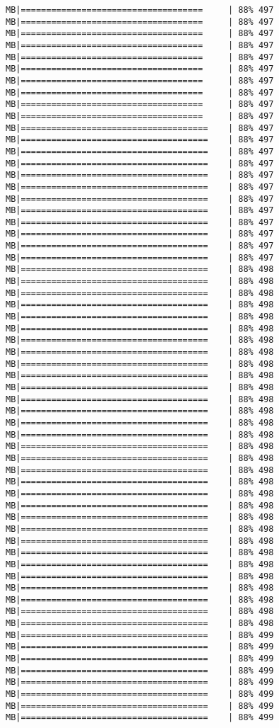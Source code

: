 \documentclass[
]{article}
\begin{document}
\begin{verbatim}
MB|====================================     | 88% 497 MB|====================================     | 88% 497 MB|====================================     | 88% 497 MB|====================================     | 88% 497 MB|====================================     | 88% 497 MB|====================================     | 88% 497 MB|====================================     | 88% 497 MB|====================================     | 88% 497 MB|====================================     | 88% 497 MB|====================================     | 88% 497 MB|=====================================    | 88% 497 MB|=====================================    | 88% 497 MB|=====================================    | 88% 497 MB|=====================================    | 88% 497 MB|=====================================    | 88% 497 MB|=====================================    | 88% 497 MB|=====================================    | 88% 497 MB|=====================================    | 88% 497 MB|=====================================    | 88% 497 MB|=====================================    | 88% 497 MB|=====================================    | 88% 497 MB|=====================================    | 88% 497 MB|=====================================    | 88% 498 MB|=====================================    | 88% 498 MB|=====================================    | 88% 498 MB|=====================================    | 88% 498 MB|=====================================    | 88% 498 MB|=====================================    | 88% 498 MB|=====================================    | 88% 498 MB|=====================================    | 88% 498 MB|=====================================    | 88% 498 MB|=====================================    | 88% 498 MB|=====================================    | 88% 498 MB|=====================================    | 88% 498 MB|=====================================    | 88% 498 MB|=====================================    | 88% 498 MB|=====================================    | 88% 498 MB|=====================================    | 88% 498 MB|=====================================    | 88% 498 MB|=====================================    | 88% 498 MB|=====================================    | 88% 498 MB|=====================================    | 88% 498 MB|=====================================    | 88% 498 MB|=====================================    | 88% 498 MB|=====================================    | 88% 498 MB|=====================================    | 88% 498 MB|=====================================    | 88% 498 MB|=====================================    | 88% 498 MB|=====================================    | 88% 498 MB|=====================================    | 88% 498 MB|=====================================    | 88% 498 MB|=====================================    | 88% 498 MB|=====================================    | 88% 498 MB|=====================================    | 88% 499 MB|=====================================    | 88% 499 MB|=====================================    | 88% 499 MB|=====================================    | 88% 499 MB|=====================================    | 88% 499 MB|=====================================    | 88% 499 MB|=====================================    | 88% 499 MB|=====================================    | 88% 499 
\end{verbatim}
\end{document}
